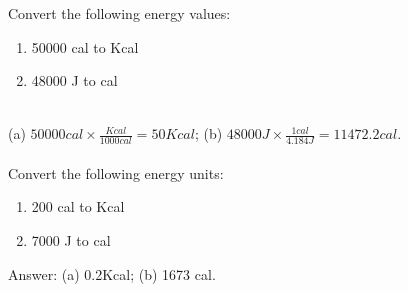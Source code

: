 \documentclass[main.tex]{subfiles}
\begin{document}
\begin{description}
\begin{example} %
Convert the following energy values:
\begin{multicols}{2}
\begin{enumerate}[label=(\alph*)]
\item 50000 cal to Kcal
\item 48000 J to cal
\end{enumerate}
\end{multicols}
\\
(a) $50000 cal\times\frac{Kcal}{1000 cal}=50Kcal  $; (b) $ 48000 J\times\frac{1 cal}{4.184 J}=11472.2 cal $.\\
\faDiamond\ \\
Convert the following energy units:
\begin{multicols}{2}
\begin{enumerate}[label=(\alph*)]
\item 200 cal to Kcal
\item 7000 J to cal
\end{enumerate}
\end{multicols}
\flushright Answer: (a) 0.2Kcal; (b) 1673 cal.
\end{example}%



\end{description}
\end{document}
